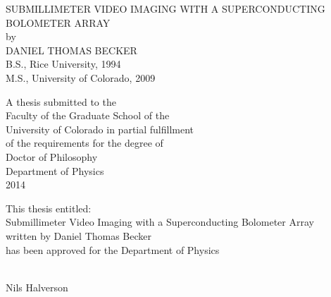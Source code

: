 \documentclass[12pt,letterpaper]{memoir}
\numberwithin{equation}{chapter}
\numberwithin{figure}{chapter}
\numberwithin{table}{chapter}
\begin{document}
\frontmatter


\newcommand{\thesistitle}{Submillimeter Video Imaging with a Superconducting Bolometer Array}

\thispagestyle{empty}
\vspace*{\fill}
\begin{center}
  \parbox{6.0in}{
    \begin{center}
      \DoubleSpacing
      \MakeUppercase{\thesistitle} \\
      by \\
      DANIEL THOMAS BECKER \\
      B.S., Rice University, 1994 \\
      M.S., University of Colorado, 2009
    \end{center}
  }
\end{center}
\vspace*{1in}
\begin{center}
  \DoubleSpacing
  A thesis submitted to the\\
  Faculty of the Graduate School of the\\
  University of Colorado in partial fulfillment\\
  of the requirements for the degree of\\
  Doctor of Philosophy \\
  Department of Physics \\
  2014
\end{center}
\vspace*{\fill}
\newpage


\thispagestyle{empty}
\vspace*{\fill}
\begin{center}
  \SingleSpacing
  This thesis entitled:\\
  \thesistitle{} \\
  written by Daniel Thomas Becker \\
  has been approved for the Department of Physics \\
\end{center}

\vspace*{2mm}

\begin{center}
  \normalsize
  \vspace*{16mm}
  \vrule width 80mm height 0.2mm\\
  Nils Halverson
\end{center}
\end{document}
